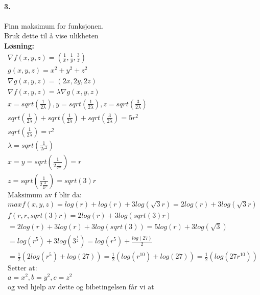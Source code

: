 \documentclass[11pt, A4paper,norsk]{article}
\begin{document}
		\paragraph{3.}
			\begin{flushleft}
Finn maksimum for funksjonen. \\
Bruk dette til å vise ulikheten \\
\vspace{1mm}
\textbf{Løsning:} \\
\vspace{1mm}
				\begin{align}
\nabla f(x, y, z) = (\frac{1}{x}, \frac{1}{y}, \frac{3}{z}) \nonumber \\
g(x, y, z) = x^2 + y^2+ z^2 \nonumber \\
\nabla g(x, y, z) = (2x, 2y, 2z) \nonumber \\
\nabla f(x, y, z) = \lambda \nabla g(x, y, z) \nonumber \\
x = sqrt(\frac{1}{2 \lambda}), y = sqrt(\frac{1}{2 \lambda}), z = sqrt(\frac{3}{2 \lambda}) \nonumber \\
sqrt(\frac{1}{2 \lambda}) + sqrt(\frac{1}{2 \lambda}) + sqrt(\frac{3}{2 \lambda}) = 5r^2 \nonumber \\
sqrt(\frac{1}{2 \lambda}) = r^2 \nonumber \\
\lambda = sqrt(\frac{1}{2r^2}) \nonumber \\
x = y = sqrt(\frac{1}{2 \frac{1}{2r^2}}) = r \nonumber \\
z = sqrt(\frac{1}{2 \frac{3}{2r^2}}) = sqrt(3)r \nonumber \\
\text{Maksimum av f blir da:} \nonumber \\
max f(x, y, z) = log(r) + log(r) + 3log(\sqrt{3}r) = 2log(r) + 3log(\sqrt{3}r) \nonumber \\
f(r, r, sqrt(3)r) = 2log(r) + 3log(sqrt(3)r) \nonumber \\
= 2log(r) + 3log(r) + 3log(sqrt(3)) = 5log(r) + 3log(\sqrt{3}) \nonumber \\
= log(r^5) + 3log(3^{\frac{1}{2}}) = log(r^5) + \frac{log(27)}{2} \nonumber \\
= \frac{1}{2}(2log(r^5) + log(27)) = \frac{1}{2}(log(r^10) + log(27))
= \frac{1}{2}(log(27r^10)) \nonumber \\
\text{Setter at:} \nonumber \\
a = x^2, b = y^2, c = z^2 \nonumber \\
\text{og ved hjelp av dette og bibetingelsen får vi at} \nonumber \\

\end{align}
\end{flushleft}
\end{document}
